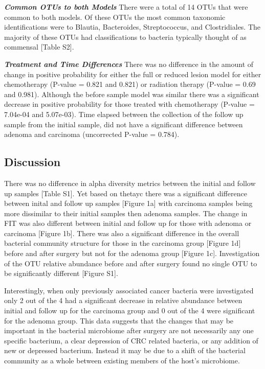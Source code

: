\documentclass[12pt,]{article}
\begin{document}
\textbf{\emph{Common OTUs to both Models}} There were a total of 14 OTUs
that were common to both models. Of these OTUs the most common taxonomic
identifications were to Blautia, Bacteroides, Streptococcus, and
Clostridiales. The majority of these OTUs had classifications to
bacteria typically thought of as commensal {[}Table S2{]}.

\textbf{\emph{Treatment and Time Differences}} There was no difference
in the amount of change in positive probability for either the full or
reduced lesion model for either chemotherapy (P-value = 0.821 and 0.821)
or radiation therapy (P-value = 0.69 and 0.981). Although the before
sample model was similar there was a significant decrease in positive
probability for those treated with chemotherapy (P-value = 7.04e-04 and
5.07e-03). Time elapsed between the collection of the follow up sample
from the initial sample, did not have a significant difference between
adenoma and carcinoma (uncorrected P-value = 0.784).

\newpage

\subsection{Discussion}\label{discussion}

There was no difference in alpha diversity metrics between the initial
and follow up samples {[}Table S1{]}. Yet based on thetayc there was a
significant difference between inital and follow up samples {[}Figure
1a{]} with carcinoma samples being more dissimilar to their initial
samples then adenoma samples. The change in FIT was also different
between initial and follow up for those with adenoma or carcinoma
{[}Figure 1b{]}. There was also a significant difference in the overall
bacterial community structure for those in the carcinoma group {[}Figure
1d{]} before and after surgery but not for the adenoma group {[}Figure
1c{]}. Investigation of the OTU relative abundance before and after
surgery found no single OTU to be significantly different {[}Figure
S1{]}.

Interestingly, when only previously associated cancer bacteria were
investigated only 2 out of the 4 had a significant decrease in relative
abundance between initial and follow up for the carcinoma group and 0
out of the 4 were significant for the adenoma group. This data suggests
that the changes that may be important in the bacterial microbiome after
surgery are not necessarily any one specific bacterium, a clear
depression of CRC related bacteria, or any addition of new or depressed
bacterium. Instead it may be due to a shift of the bacterial community
as a whole between existing members of the host's microbiome.
\end{document}
